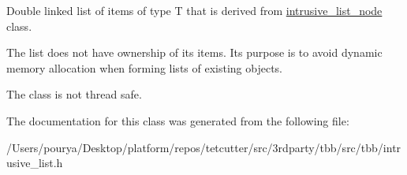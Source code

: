 Double linked list of items of type T that is derived from \hyperlink{structtbb_1_1internal_1_1intrusive__list__node}{intrusive\+\_\+list\+\_\+node} class. 

The list does not have ownership of its items. Its purpose is to avoid dynamic memory allocation when forming lists of existing objects.

The class is not thread safe. 

The documentation for this class was generated from the following file\+:\begin{DoxyCompactItemize}
\item 
/\+Users/pourya/\+Desktop/platform/repos/tetcutter/src/3rdparty/tbb/src/tbb/intrusive\+\_\+list.\+h\end{DoxyCompactItemize}
